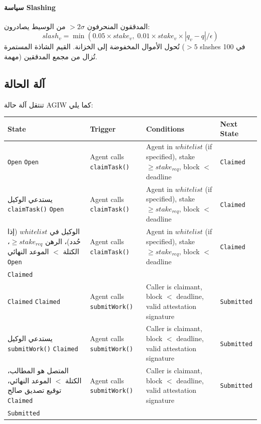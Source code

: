 \documentclass[11pt]{article}
\begin{document}
\paragraph{سياسة Slashing} المدققون المنحرفون $>2\sigma$ من الوسيط يصادرون:
\begin{equation}
slash_v = \min(0.05 \times stake_v, \; 0.01 \times stake_v \times |q_v - q| / \epsilon)
\end{equation}
تُحول الأموال المخفوضة إلى الخزانة. القيم الشاذة المستمرة ($>5$ slashes في 100 مهمة) تُزال من مجمع المدققين.

\subsection{آلة الحالة}
\label{sec:agiw-state-machine}
تنتقل آلة حالة AGIW كما يلي:
\begin{longtable}{@{}p{}p{}p{}p{}@{}}
\toprule
\textbf{State} & \textbf{Trigger} & \textbf{Conditions} & \textbf{Next State} \\\midrule
\texttt{Open} \texttt{Open} & Agent calls \texttt{claimTask()} & Agent in $whitelist$ (if specified), stake $\geq stake_{req}$, block $<$ deadline & \texttt{Claimed} \\ يستدعي الوكيل \texttt{claimTask()} \texttt{Open} & Agent calls \texttt{claimTask()} & Agent in $whitelist$ (if specified), stake $\geq stake_{req}$, block $<$ deadline & \texttt{Claimed} \\ الوكيل في $whitelist$ (إذا حُدد)، الرهن $\geq stake_{req}$، الكتلة $<$ الموعد النهائي \texttt{Open} & Agent calls \texttt{claimTask()} & Agent in $whitelist$ (if specified), stake $\geq stake_{req}$, block $<$ deadline & \texttt{Claimed} \\ \texttt{Claimed} \\
\texttt{Claimed} \texttt{Claimed} & Agent calls \texttt{submitWork()} & Caller is claimant, block $<$ deadline, valid attestation signature & \texttt{Submitted} \\ يستدعي الوكيل \texttt{submitWork()} \texttt{Claimed} & Agent calls \texttt{submitWork()} & Caller is claimant, block $<$ deadline, valid attestation signature & \texttt{Submitted} \\ المتصل هو المطالب، الكتلة $<$ الموعد النهائي، توقيع تصديق صالح \texttt{Claimed} & Agent calls \texttt{submitWork()} & Caller is claimant, block $<$ deadline, valid attestation signature & \texttt{Submitted} \\ \texttt{Submitted} \\

\end{longtable}
\end{document}
